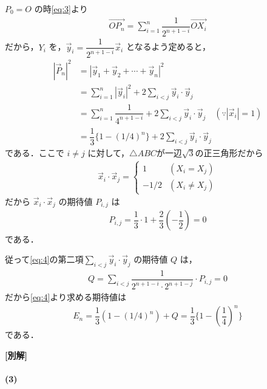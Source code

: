 \documentclass[../../main.tex]{subfiles}
\begin{document}
$P_0 = O$ の時\cref{eq:3}より
\begin{align}
  \overrightarrow{OP_n} = \sum_{i=1}^n \dfrac{1}{2^{n+1-i}} \overrightarrow{OX_i}
\end{align}
だから，$Y_i$ を，$\vec{y}_i = \dfrac{1}{2^{n+1-i}} \vec{x}_i$ となるよう定めると，
\begin{align}
  |\vec{P}_n|^2
  & = |\vec{y}_1 + \vec{y}_2 + \cdots + \vec{y}_n|^2 \\
  & = \sum_{i=1}^n |\vec{y}_i|^2 + 2 \sum_{i < j} \vec{y}_i \cdot \vec{y}_j \\
  & = \sum_{i=1}^n \dfrac{1}{4^{n+1-i}} + 2 \sum_{i < j} \vec{y}_i \cdot \vec{y}_j \quad (\because |\vec{x}_i| = 1) \\
  & = \dfrac{1}{3}\{1 - (1/4)^n\} + 2 \sum_{i < j} \vec{y}_i \cdot \vec{y}_j \label{eq:4}
\end{align}
である．ここで $i \ne j$ に対して，$\triangle ABC$が一辺$\sqrt{3}$の正三角形だから
\begin{align}
  \vec{x}_i \cdot \vec{x}_j =
  \begin{cases}
    1 & (X_i = X_j) \\
    -1/2 & (X_i \ne X_j)
  \end{cases}
\end{align}
だから $\vec{x}_i \cdot \vec{x}_j$ の期待値 $P_{i,j}$ は
\begin{align}
  P_{i,j} = \dfrac{1}{3} \cdot 1 + \dfrac{2}{3} \left(-\dfrac{1}{2}\right) = 0
\end{align}
である．

従って\cref{eq:4}$の第二項\sum_{i < j} \vec{y}_i \cdot \vec{y}_j$ の期待値 $Q$ は，
\begin{align}
  Q = \sum_{i < j} \dfrac{1}{2^{n+1-i} \cdot 2^{n+1-j}} \cdot P_{i,j} = 0
\end{align}
だから\cref{eq:4}より求める期待値は
\begin{align}
  E_n = \dfrac{1}{3}(1 - (1/4)^n) + Q = \dfrac{1}{3} \{ 1 - \left(\dfrac{1}{4}\right)^n \}
\end{align}
である．

{\bf [別解]}

\paragraph{(3)}
\end{document}
